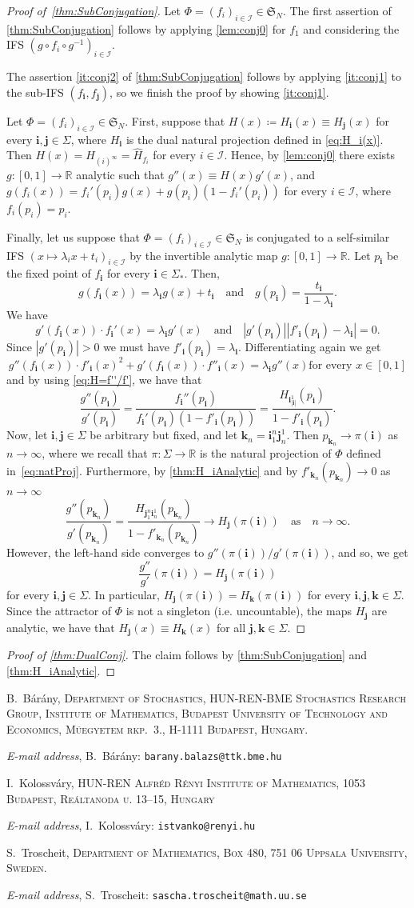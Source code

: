\documentclass[11pt,a4paper]{article}
\makeatletter
\def\cref#1{\ref{#1}}%
\theoremstyle{definition}
\theoremstyle{remark}
\newcommand{\0}{\mathbf{0}}
\newcommand{\bi}{\mathbf{i}}
\newcommand{\bj}{\mathbf{j}}
\newcommand{\bk}{{\mathbf{k}}}
\numberwithin{equation}{section}
\newcommand{\Addresses}{{%
  \bigskip
  \footnotesize

  B.~B\'ar\'any, \textsc{Department of Stochastics, HUN-REN-BME Stochastics Research Group,
  Institute of Mathematics, Budapest University of Technology and Economics, M\H{u}egyetem rkp.~3.,
H-1111 Budapest, Hungary.}\par\nopagebreak
  \textit{E-mail address}, B.~B\'ar\'any: \texttt{barany.balazs@ttk.bme.hu}

  \medskip

  I.~Kolossv\'ary, \textsc{HUN-REN Alfr\'ed R\'enyi Institute of Mathematics, 1053 Budapest, Re\'altanoda u.
13–15, Hungary}\par\nopagebreak
  \textit{E-mail address}, I.~Kolossv\'ary: \texttt{istvanko@renyi.hu}
   \medskip


  S.~Troscheit, \textsc{Department of Mathematics, Box 480, 751 06 Uppsala University, Sweden.}\par\nopagebreak
  \textit{E-mail address}, S.~Troscheit: \texttt{sascha.troscheit@math.uu.se}
}}
\makeatother
\begin{document}
\begin{proof}[Proof of~\cref{thm:SubConjugation}]
	Let $\Phi=(f_i)_{i\in\mathcal{I}}\in\mathfrak{S}_N$. The first assertion of
	\cref{thm:SubConjugation} follows by applying \cref{lem:conj0} for $f_1$ and considering the
	IFS $(g\circ f_i\circ g^{-1})_{i\in\mathcal{I}}$.
	
	The assertion \cref{it:conj2} of \cref{thm:SubConjugation} follows by
	applying \cref{it:conj1} to the sub-IFS $(f_{\bi},f_{\bj})$, so we finish the proof by
	showing \cref{it:conj1}.
	
	Let $\Phi=(f_i)_{i\in\mathcal{I}}\in\mathfrak{S}_N$. First, suppose that $H(x)\coloneqq
	H_{\bi}(x)\equiv H_{\bj}(x)$ for every $\bi,\bj\in\Sigma$, where $H_{\bi}$ is the dual
	natural projection defined in \cref{eq:H_i(x)}. Then $H(x)=H_{(i)^{\infty}}=\hat{H}_{f_i}$
	for every $i\in\mathcal{I}$. Hence, by \cref{lem:conj0} there exists
	$g\colon[0,1]\to\mathbb{R}$ analytic such that $g''(x)\equiv H(x)g'(x)$, and
	$g(f_i(x))=f_i'(p_i)g(x)+g(p_i)(1-f_i'(p_i))$ for every $i\in\mathcal{I}$, where
	$f_i(p_i)=p_i$.
	
	Finally, let us suppose that $\Phi=(f_i)_{i\in\mathcal{I}}\in\mathfrak{S}_N$ is conjugated
	to a self-similar IFS $(x\mapsto \lambda_ix+t_i)_{i\in\mathcal{I}}$ by the invertible
	analytic map $g\colon[0,1]\to\mathbb{R}$. Let $p_{\bi}$ be the fixed point of $f_{\bi}$ for
	every $\bi\in\Sigma_*$. 
	Then,
\[
g(f_{\bi}(x)) = \lambda_{\bi} g(x) + t_{\bi}
\quad\text{and}\quad
g(p_{\bi}) = \frac{t_{\bi}}{1-\lambda_{\bi}}.
\]
We have
\[
g'(f_{\bi}(x))\cdot f_{\bi}'(x) = \lambda_{\bi} g'(x)
\quad\text{and}\quad
|g'(p_{\bi})||f'_{\bi}(p_{\bi})-\lambda_{\bi}| = 0.
\]
Since $|g'(p_{\bi})|>0$ we must have $f'_{\bi}(p_{\bi}) = \lambda_{\bi}$.
Differentiating again we get
\[
g''(f_{\bi}(x))\cdot f'_{\bi}(x)^2 +g'(f_{\bi}(x))\cdot f''_{\bi}(x) = \lambda_{\bi} g''(x)\text{
for every }x\in[0,1]
\]
and by using \cref{eq:H=f''/f'}, we have that
\[
\frac{g''(p_{\bi})}{g'(p_{\bi})} =
\frac{f_{\bi}''(p_{\bi})}{f_{\bi}'(p_{\bi})(1-f'_{\bi}(p_{\bi}))}
=\frac{H_{\bi_{|\bi|}^1}(p_{\bi})}{1-f'_{\bi}(p_{\bi})}.
\]
Now, let $\bi,\bj\in\Sigma$ be arbitrary but fixed, and let $\bk_n = \bi_1^{n} \bj_n^1$. Then
$p_{\bk_n}\to \pi(\bi)$ as $n\to\infty$, where we recall that $\pi\colon\Sigma\to\mathbb{R}$ is the
natural projection of $\Phi$ defined in~\cref{eq:natProj}. Furthermore, by \cref{thm:H_iAnalytic} and by
$f'_{\bk_n}(p_{\bk_n})\to0$ as $n\to\infty$
\[
\frac{g''(p_{\bk_n})}{g'(p_{\bk_n})}
=\frac{H_{\bj_1^n \bi_n^1}(p_{\bk_n})}{1-f'_{\bk_n}(p_{\bk_n})}
\to
H_{\bj}(\pi(\bi))\quad \text{as}\quad n\to\infty.
\]
However, the left-hand side converges to $g''(\pi(\bi))/g'(\pi(\bi))$, and so, we get 
$$
\frac{g''}{g'}(\pi(\bi))=H_{\bj}(\pi(\bi))
$$
for every $\bi,\bj\in\Sigma$. In particular, $H_{\bj}(\pi(\bi))=H_{\bk}(\pi(\bi))$ for every
$\bi,\bj,\bk\in\Sigma$. Since the attractor of $\Phi$ is not a singleton (i.e. uncountable), the
maps $H_{\bj}$ are analytic, we have that $H_{\bj}(x)\equiv H_{\bk}(x)$ for all $\bj,\bk\in \Sigma$.
\end{proof}

\begin{proof}[Proof of \cref{thm:DualConj}]
	The claim follows by \cref{thm:SubConjugation} and \cref{thm:H_iAnalytic}.
\end{proof}

\printbibliography



\Addresses
\end{document}
